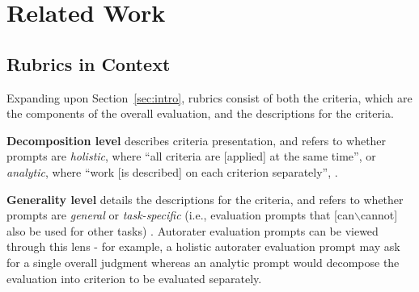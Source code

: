 \section{Related Work}


\subsection{Rubrics in Context}

Expanding upon Section~\ref{sec:intro}, rubrics consist of both the criteria, which are the components of the overall evaluation, and the descriptions for the criteria. 

\textbf{Decomposition level} describes criteria presentation, and refers to whether prompts are \textit{holistic}, where ``all criteria are [applied] at the same time'', or \textit{analytic}, where ``work [is described] on each criterion separately'', \citep{brookhart2013create}. 

\textbf{Generality level} details the descriptions for the criteria, and refers to whether prompts are \textit{general} or \textit{task-specific} (i.e., evaluation prompts that [can$\backslash$cannot] also be used for other tasks) \citep{brookhart2013create}. Autorater evaluation prompts can be viewed through this lens - for example, a holistic autorater evaluation prompt may ask for a single overall judgment whereas an analytic prompt would decompose the evaluation into criterion to be evaluated separately.


